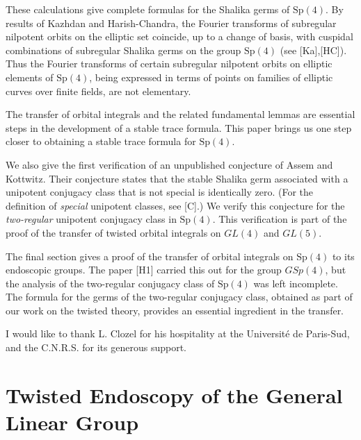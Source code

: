 \documentclass{amsart}
\begin{document}
These calculations  give complete formulas for the
Shalika germs of $\text{Sp}(4)$.  
By results of Kazhdan and Harish-Chandra, the Fourier
transforms of subregular nilpotent orbits on the elliptic set coincide,
up to a change of basis, with cuspidal combinations
of subregular Shalika germs
on the group $\text{Sp}(4)$ (see [Ka],[HC]). 
Thus the Fourier transforms of certain subregular
nilpotent orbits on elliptic elements of
$\text{Sp}(4)$, being
expressed in terms of
points on families of elliptic curves over finite fields,
are not elementary.

The transfer of orbital integrals and the related fundamental
lemmas are essential steps in the development of a stable
trace formula. This paper brings us one step closer
to obtaining a stable trace formula for $\text{Sp}(4)$.

We also give the first verification of an unpublished conjecture of
Assem and Kottwitz.  Their conjecture states that the
stable Shalika germ associated with a unipotent
conjugacy class that is not special is identically zero.  
(For the definition of {\it special} unipotent classes, see [C].)
We verify this conjecture for
the {\it two-regular} unipotent conjugacy class in $\text{Sp}(4)$.  This
verification is part of the proof of the transfer of twisted
orbital integrals on $GL(4)$ and $GL(5)$.

The final section gives a proof of the transfer of orbital
integrals on $\text{Sp}(4)$ to its endoscopic groups.  The paper
[H1] carried this out for the group $GSp(4)$, but the
analysis of the two-regular conjugacy class of $\text{Sp}(4)$ was left
incomplete.  The formula for the germs of the two-regular
conjugacy class, obtained
as part of our work on the twisted theory, provides an
essential ingredient in the transfer.

I would like to thank L. Clozel for his
hospitality at the Universit\'e de Paris-Sud, and
the C.N.R.S. for its generous support.

\section{Twisted Endoscopy of the General Linear Group}
\end{document}
